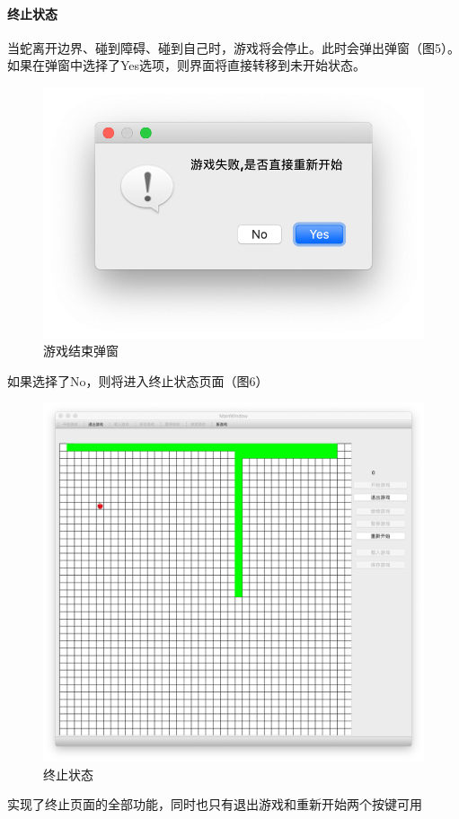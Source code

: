 \documentclass[utf-8]{ctexart}
\begin{document}
    \paragraph{终止状态}
    当蛇离开边界、碰到障碍、碰到自己时，游戏将会停止。此时会弹出弹窗（图5）。如果在弹窗中选择了Yes选项，则界面将直接转移到未开始状态。
    \begin{figure}[H]
        \centering
        \includegraphics[scale = 0.5]{texsrc/游戏结束弹窗.png}
        \caption{游戏结束弹窗}
        \label{messagebox}
    \end{figure}
    如果选择了No，则将进入终止状态页面（图6）
    \begin{figure}[H]
        \centering
        \includegraphics[scale = 0.2]{texsrc/终止状态界面.png}
        \caption{终止状态}
        \label{ended}
    \end{figure}
    实现了终止页面的全部功能，同时也只有退出游戏和重新开始两个按键可用
\end{document}
